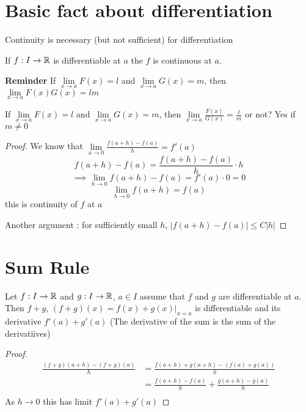 \section{Basic fact about differentiation}

Continuity is necessary (but not sufficient) for differentiation 

\begin{theorem*}
  If $f: I \to \mathbb R$ is differentiable at $a$ the $f$ is continuous at $a$.
\end{theorem*}

\textbf{Reminder} If $\lim\limits_{x \to a} F(x) = l$ and $\lim\limits_{x \to a} G(x) = m$, then $\lim\limits_{x \to a} F(x)G(x)= lm$

If $\lim\limits_{x \to a} F(x) = l$ and $\lim\limits_{x \to a} G(x) = m$, then $\lim\limits_{x \to a} \frac{F(x)}{G(x)}= \frac{l}{m}$ or not? Yes if $m \neq 0$

\begin{proof}
  We know that $\lim\limits_{x \to 0} \frac{f(a + h) - f(a)}{h} = f'(a)$
  $$f(a + h) - f(a) = \frac{f(a + h) - f(a)}{h} \cdot h$$
  $$\implies \lim\limits_{h \to 0} f(a + h) - f(a) = f'(a) \cdot 0 = 0$$
  $$\lim\limits_{h \to 0} f(a + h) = f(a)$$ 
  this is continuity of $f$ at $a$
  
  Another argument : for sufficiently small $h$, $|f(a + h) - f(a)| \leq C|h|$
\end{proof}

\section{Sum Rule}

\begin{theorem*}
  Let $f: I \to \mathbb R$ and $g: I \to \mathbb R$, $a\in I$ assume that $f$ and $g$ are differentiable at $a$. 
  Then $f + g$, $(f + g)(x) = f(x) + g(x)|_{x = a}$ is differentiable and its derivative $f'(a) + g'(a)$
  (The derivative of the sum is the sum of the derivatiives)
\end{theorem*}

\begin{proof}
  \begin{align*}
    \frac{(f+g)(a + h) - (f+g)(a)}{h} &= \frac{f(a + h) + g(a + h) - (f(a) + g(a))}{h} \\
    &= \frac{f(a + h) - f(a)}{h} + \frac{g(a + h) - g(a)}{h} \\
  \end{align*}
  As $h \to 0$ this has limit $f'(a) + g'(a)$
\end{proof}

